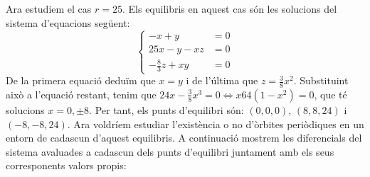 \documentclass[a4paper]{article}
\theoremstyle{definition}
\begin{document}
Ara estudiem el cas $r = 25$. Els equilibris en aquest cas són les solucions del sistema d'equacions següent:
\begin{equation*}
  \left\{
  \begin{aligned}
    -x+y              & =  0 \\
    25x-y-xz          & = 0  \\
    -\frac{8}{3}z +xy & =0
  \end{aligned}
  \right.
\end{equation*}
De la primera equació deduïm que $x = y$ i de l'última que $z = \frac{3}{8}x^2$. Substituint això a l'equació restant, tenim que $24x -\frac{3}{8}x^3=0\iff x64(1-x^2)=0$, que té solucions $x=0,\pm 8$. Per tant, els punts d'equilibri són: $(0,0,0)$, $(8,8,24)$ i $(-8,-8,24)$. Ara voldríem estudiar l'existència o no d'òrbites periòdiques en un entorn de cadascun d'aquest equilibris. A continuació mostrem les diferencials del sistema avaluades a cadascun dels punts d'equilibri juntament amb els seus corresponents valors propis:
\end{document}
